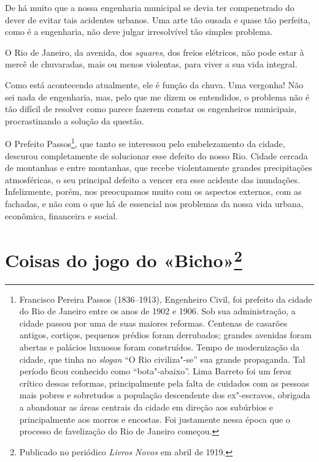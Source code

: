 De há muito que a nossa engenharia municipal se devia ter compenetrado
do dever de evitar tais acidentes urbanos. Uma arte tão ousada e quase
tão perfeita, como é a engenharia, não deve julgar irresolvível tão
simples problema.

O Rio de Janeiro, da avenida, dos \emph{squares}, dos freios elétricos,
não pode estar à mercê de chuvaradas, mais ou menos violentas, para
viver a sua vida integral.

Como está acontecendo atualmente, ele é função da chuva. Uma vergonha!
Não sei nada de engenharia, mas, pelo que me dizem os entendidos, o
problema não é tão difícil de resolver como parece fazerem constar os
engenheiros municipais, procrastinando a solução da questão.

O Prefeito Passos\footnote{Francisco Pereira Passos (1836--1913),
  Engenheiro Civil, foi prefeito da cidade do Rio de Janeiro entre os
  anos de 1902 e 1906. Sob sua administração, a cidade passou por uma de
  suas maiores reformas. Centenas de casarões antigos, cortiços,
  pequenos prédios foram derrubados; grandes avenidas foram abertas e
  palácios luxuosos foram construídos. Tempo de modernização da cidade,
  que tinha no \emph{slogan} ``O Rio civiliza"-se'' sua grande
  propaganda. Tal período ficou conhecido como ``bota"-abaixo''. Lima
  Barreto foi um feroz crítico dessas reformas, principalmente pela
  falta de cuidados com as pessoas mais pobres e sobretudos a população
  descendente dos ex"-escravos, obrigada a abandonar as áreas centrais da
  cidade em direção aos subúrbios e principalmente aos morros e
  encostas. Foi justamente nessa época que o processo de favelização do
  Rio de Janeiro começou.}, que tanto se interessou pelo embelezamento
da cidade, descurou completamente de solucionar esse defeito do nosso
Rio. Cidade cercada de montanhas e entre montanhas, que recebe
violentamente grandes precipitações atmosféricas, o seu principal
defeito a vencer era esse acidente das inundações. Infelizmente, porém,
nos preocupamos muito com os aspectos externos, com as fachadas, e não
com o que há de essencial nos problemas da nossa vida urbana, econômica,
financeira e social.



\chapter[Coisas do jogo do «Bicho»]{Coisas do jogo do «Bicho»\footnote[*]{Publicado no periódico \emph{Livros Novos} em abril de 1919.}}

